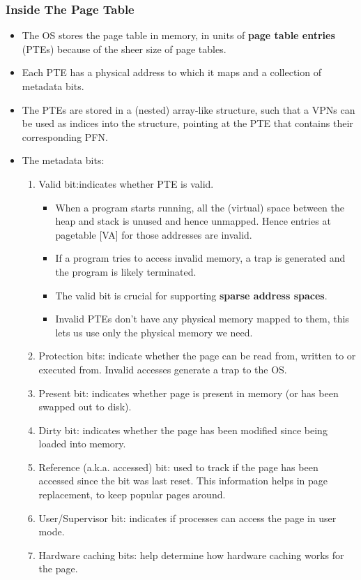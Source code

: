 \documentclass[10pt]{report}
\begin{document}
\subsubsection{Inside The Page Table}
\begin{itemize}
\item The OS stores the page table in memory, in units of
\textbf{page table entries} (PTEs) because of the sheer size of page tables.
\item Each PTE has a physical address to which it maps and a collection of metadata bits.
\item The PTEs are stored in a (nested) array-like structure, such
that a VPNs can be used as indices into the structure, pointing
at the PTE that contains their corresponding PFN.
\item The metadata bits:
\begin{enumerate}
    \item Valid bit:indicates whether PTE is valid.
    \begin{itemize}
        \item When a program starts running, all the (virtual) space 
        between the heap and stack is unused and hence unmapped. 
        Hence entries at pagetable [VA] for those addresses are 
        invalid.
        \item If a program tries to access invalid memory, a trap is
        generated and the program is likely terminated.
        \item The valid bit is crucial for supporting \textbf{sparse address spaces}.
        \item Invalid PTEs don't have any physical memory mapped to 
        them, this lets us use only the physical memory we need.
    \end{itemize}
     \item Protection bits: indicate whether the page can be
     read from, written to or executed from. Invalid accesses
     generate a trap to the OS.
     \item Present bit: indicates whether page is present in memory
     (or has been swapped out to disk).
     \item Dirty bit: indicates whether the page has been modified 
     since being loaded into memory.
     \item Reference (a.k.a. accessed) bit: used to track if the
     page has been accessed since the bit was last reset. This 
     information helps in page replacement, to keep popular pages
     around.
     \item User/Supervisor bit: indicates if processes can access
     the page in user mode.
     \item Hardware caching bits: help determine how hardware caching works for the page. 
\end{enumerate}
\end{itemize}
\end{document}
